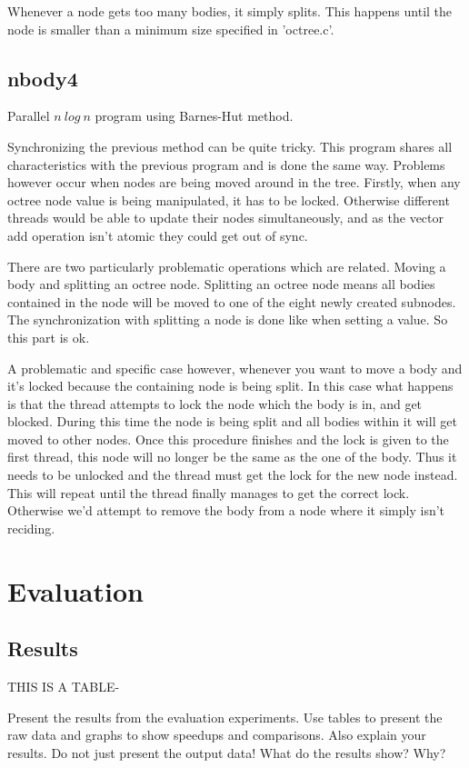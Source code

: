 \documentclass[a4paper] {article}
\begin{document}
Whenever a node gets too many bodies, it simply splits. This happens until the node is smaller than a minimum size specified in 'octree.c'.

\subsection{nbody4}

Parallel $n\ log\ n$ program using Barnes-Hut method.

Synchronizing the previous method can be quite tricky. This program shares all characteristics with the previous program and is done the same way. Problems however occur when nodes are being moved around in the tree. Firstly, when any octree node value is being manipulated, it has to be locked. Otherwise different threads would be able to update their nodes simultaneously, and as the vector add operation isn't atomic they could get out of sync.

There are two particularly problematic operations which are related. Moving a body and splitting an octree node. Splitting an octree node means all bodies contained in the node will be moved to one of the eight newly created subnodes. The synchronization with splitting a node is done like when setting a value. So this part is ok.

A problematic and specific case however, whenever you want to move a body and it's locked because the containing node is being split. In this case what happens is that the thread attempts to lock the node which the body is in, and get blocked. During this time the node is being split and all bodies within it will get moved to other nodes. Once this procedure finishes and the lock is given to the first thread, this node will no longer be the same as the one of the body. Thus it needs to be unlocked and the thread must get the lock for the new node instead. This will repeat until the thread finally manages to get the correct lock. Otherwise we'd attempt to remove the body from a node where it simply isn't reciding.

\section{Evaluation}

\subsection{Results}
THIS IS A TABLE-

Present the results from the evaluation experiments. Use tables to present the raw data and graphs to show speedups and comparisons. Also explain your results. Do not just present the output data! What do the results show? Why?
\end{document}
